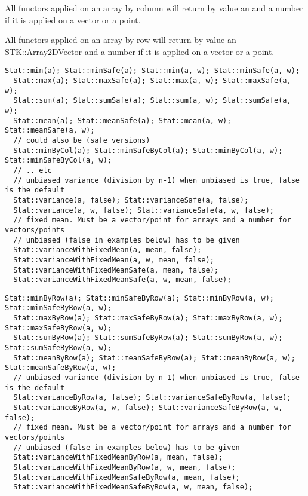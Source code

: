 \documentclass[a4paper,10pt]{article}
\begin{document}
All functors applied on an array by column will return by value an
 and a number if it is applied on a vector or a point.

All functors applied on an array by row will return by value an STK::Array2DVector
and a number if it is applied on a vector or a point.

\begin{lstlisting}[style=customcpp,caption=Functors by column]
  Stat::min(a); Stat::minSafe(a); Stat::min(a, w); Stat::minSafe(a, w);
  Stat::max(a); Stat::maxSafe(a); Stat::max(a, w); Stat::maxSafe(a, w);
  Stat::sum(a); Stat::sumSafe(a); Stat::sum(a, w); Stat::sumSafe(a, w);
  Stat::mean(a); Stat::meanSafe(a); Stat::mean(a, w); Stat::meanSafe(a, w);
  // could also be (safe versions)
  Stat::minByCol(a); Stat::minSafeByCol(a); Stat::minByCol(a, w); Stat::minSafeByCol(a, w);
  // .. etc
  // unbiased variance (division by n-1) when unbiased is true, false is the default
  Stat::variance(a, false); Stat::varianceSafe(a, false);
  Stat::variance(a, w, false); Stat::varianceSafe(a, w, false);
  // fixed mean. Must be a vector/point for arrays and a number for vectors/points
  // unbiased (false in examples below) has to be given
  Stat::varianceWithFixedMean(a, mean, false);
  Stat::varianceWithFixedMean(a, w, mean, false);
  Stat::varianceWithFixedMeanSafe(a, mean, false);
  Stat::varianceWithFixedMeanSafe(a, w, mean, false);
\end{lstlisting}


\begin{lstlisting}[style=customcpp,caption=Functors by row]
  Stat::minByRow(a); Stat::minSafeByRow(a); Stat::minByRow(a, w); Stat::minSafeByRow(a, w);
  Stat::maxByRow(a); Stat::maxSafeByRow(a); Stat::maxByRow(a, w); Stat::maxSafeByRow(a, w);
  Stat::sumByRow(a); Stat::sumSafeByRow(a); Stat::sumByRow(a, w); Stat::sumSafeByRow(a, w);
  Stat::meanByRow(a); Stat::meanSafeByRow(a); Stat::meanByRow(a, w); Stat::meanSafeByRow(a, w);
  // unbiased variance (division by n-1) when unbiased is true, false is the default
  Stat::varianceByRow(a, false); Stat::varianceSafeByRow(a, false);
  Stat::varianceByRow(a, w, false); Stat::varianceSafeByRow(a, w, false);
  // fixed mean. Must be a vector/point for arrays and a number for vectors/points
  // unbiased (false in examples below) has to be given
  Stat::varianceWithFixedMeanByRow(a, mean, false);
  Stat::varianceWithFixedMeanByRow(a, w, mean, false);
  Stat::varianceWithFixedMeanSafeByRow(a, mean, false);
  Stat::varianceWithFixedMeanSafeByRow(a, w, mean, false);
\end{lstlisting}
\end{document}
